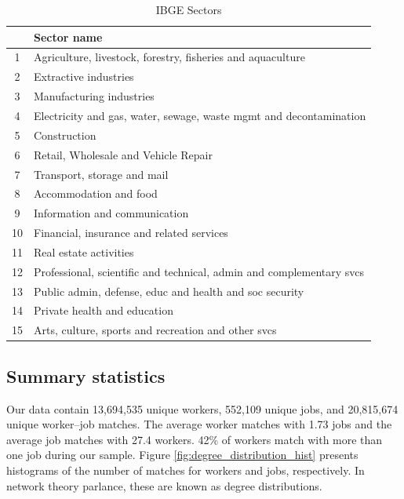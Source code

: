 \documentclass[12pt]{article}
\theoremstyle{definition}
\theoremstyle{plain}
\begin{document}
\begin{table}
	\centering
	\caption{IBGE Sectors}
	\begin{tabular}{cl}
		\toprule
		& Sector name \\
		\midrule
		1	& Agriculture, livestock, forestry, fisheries and aquaculture  \\
		2	& Extractive industries  \\
		3	& Manufacturing industries  \\
		4	& Electricity and gas, water, sewage, waste mgmt and decontamination  \\
		5	& Construction  \\
		6	& Retail, Wholesale and Vehicle Repair  \\
		7	& Transport, storage and mail  \\
		8	& Accommodation and food  \\
		9	& Information and communication  \\
		10	& Financial, insurance and related services  \\
		11	& Real estate activities  \\
		12	& Professional, scientific and technical, admin and complementary svcs  \\
		13	& Public admin, defense, educ and health and soc security  \\
		14	& Private health and education  \\
		15	& Arts, culture, sports and recreation and other svcs \\
		\bottomrule
	\end{tabular}
	\label{table:IBGE_sectors}
\end{table}


\subsection{Summary statistics}



Our data contain 13,694,535 unique workers, 552,109 unique jobs, and 20,815,674 unique worker--job matches. The average worker matches with 1.73 jobs and the average job matches with 27.4 workers. 42\% of workers match with more than one job during our sample. Figure \ref{fig:degree_distribution_hist} presents histograms of the number of matches for workers and jobs, respectively. In network theory parlance, these are known as degree distributions. 
\end{document}
